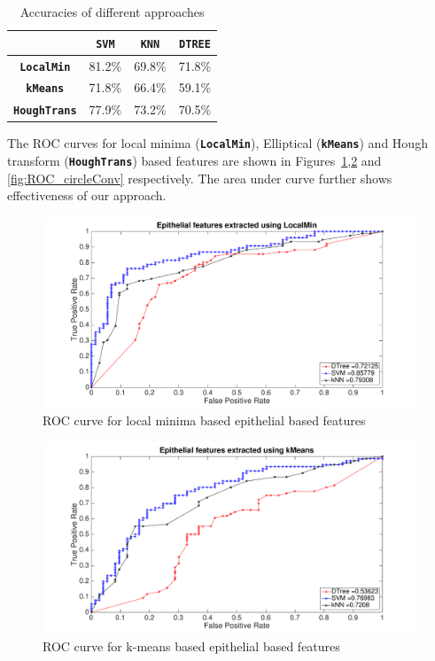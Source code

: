 \begin{table}
\centering
\begin{tabular}{|c|c|c|c| }
\hline
 & \textbf{\texttt{SVM}} & \textbf{\texttt{KNN}} & \textbf{\texttt{DTREE}} \\ \hline
\textbf{\texttt{LocalMin}} & 81.2\% & 69.8\% & 71.8\% \\ \hline
\textbf{\texttt{kMeans}} & 71.8\%  & 66.4\% & 59.1\% \\ \hline
\textbf{ \texttt{HoughTrans}} & 77.9\% & 73.2\% & 70.5\% \\ \hline
\end{tabular}
\caption{\label{table:accuracy}Accuracies of different approaches}
\end{table}

The ROC curves for local minima (\textbf{\texttt{LocalMin}}), Elliptical (\textbf{\texttt{kMeans}}) and Hough transform (\textbf{\texttt{HoughTrans}}) based features are shown in Figures~\ref{fig:ROC_localMin},\ref{fig:ROC_kMeans} and \ref{fig:ROC_circleConv} respectively. The area under curve further shows effectiveness of our approach. 

 

\begin{figure}
\includegraphics[scale=0.2]{figs/ROC_localMin.pdf}
\caption{\label{fig:ROC_localMin}ROC curve for local minima based epithelial based features}
\end{figure}  

\begin{figure}
\includegraphics[scale=0.2]{figs/ROC_kMeans.pdf}
\caption{\label{fig:ROC_kMeans}ROC curve for k-means based epithelial based features}
\end{figure}


